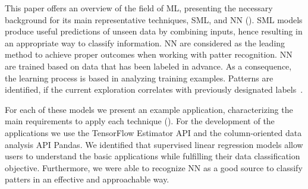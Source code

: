 This paper offers an overview of the field of \ac{ML}, presenting the necessary background for its 
main representative techniques, \ac{SML}, and \ac{NN} (). 
\ac{SML} models produce useful predictions of unseen data by combining inputs, hence resulting in 
an appropriate way to classify information. \ac{NN} are considered as the leading method to achieve 
proper outcomes when working with patter recognition. \ac{NN} are trained based on data that has 
been labeled in advance. As a consequence, the learning process is based in analyzing training 
examples. Patterns are identified, if the current exploration  correlates with previously designated 
labels~\cite{mit17}. 

For each of these models we present an example application, characterizing the main 
requirements to apply each technique (). For the development of the applications 
we use the TensorFlow Estimator API and the column-oriented data analysis API Pandas.
We identified that supervised linear regression models allow users to understand the basic 
applications while fulfilling their data classification objective. Furthermore, we were able to recognize 
\ac{NN} as a good source to classify patters in an effective and approachable way. 


\endinput

